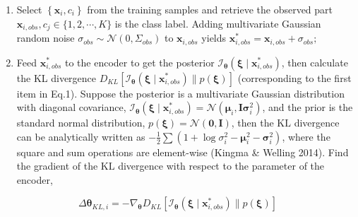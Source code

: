 \documentclass[10pt]{article}
\begin{document}
\begin{enumerate}
  \item Select $\left\{\boldsymbol{x}_{i}, c_{i}\right\}$ from the training samples and retrieve the observed part $\boldsymbol{x}_{i, o b s}, c_{j} \in\{1,2, \cdots, K\}$ is the class label. Adding multivariate Gaussian random noise $\sigma_{o b s} \sim \mathcal{N}\left(0, \Sigma_{o b s}\right)$ to $\boldsymbol{x}_{i, o b s}$ yields $\boldsymbol{x}_{i, o b s}^{*}=\boldsymbol{x}_{i, o b s}+\sigma_{o b s} ;$

  \item Feed $\boldsymbol{x}_{i, o b s}^{*}$ to the encoder to get the posterior $\mathcal{I}_{\boldsymbol{\theta}}\left(\boldsymbol{\xi} \mid \boldsymbol{x}_{i, o b s}^{*}\right)$, then calculate the KL divergence $D_{K L}\left[\mathcal{I}_{\boldsymbol{\theta}}\left(\boldsymbol{\xi} \mid \boldsymbol{x}_{i, o b s}^{*}\right) \| p(\boldsymbol{\xi})\right]$ (corresponding to the first item in Eq.1). Suppose the posterior is a multivariate Gaussian distribution with diagonal covariance, $\mathcal{I}_{\boldsymbol{\theta}}\left(\boldsymbol{\xi} \mid \boldsymbol{x}_{i, o b s}^{*}\right)=\mathcal{N}\left(\boldsymbol{\mu}_{i}, \mathbf{I} \boldsymbol{\sigma}_{i}^{2}\right)$, and the prior is the standard normal distribution, $p(\boldsymbol{\xi})=\mathcal{N}(\mathbf{0}, \mathbf{I})$, then the $\mathrm{KL}$ divergence can be analytically written as $-\frac{1}{2} \sum\left(1+\log \sigma_{i}^{2}-\boldsymbol{\mu}_{i}^{2}-\boldsymbol{\sigma}_{i}^{2}\right)$, where the square and sum operations are element-wise (Kingma \& Welling 2014). Find the gradient of the $\mathrm{KL}$ divergence with respect to the parameter of the encoder,

\end{enumerate}
$$
\Delta \boldsymbol{\theta}_{K L, i}=-\nabla_{\boldsymbol{\theta}} D_{K L}\left[\mathcal{I}_{\boldsymbol{\theta}}\left(\boldsymbol{\xi} \mid \boldsymbol{x}_{i, o b s}^{*}\right) \| p(\boldsymbol{\xi})\right]
$$
\end{document}
